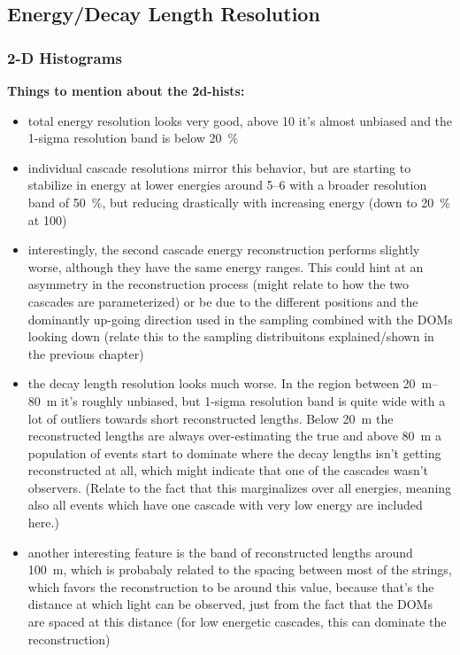\subsection{Energy/Decay Length Resolution}


\subsubsection{2-D Histograms}

\textbf{Things to mention about the 2d-hists:}
\begin{itemize}
    \item total energy resolution looks very good, above \SI{10}{\gev} it's almost unbiased and the 1-sigma resolution band is below \SI{20}{\percent}
    \item individual cascade resolutions mirror this behavior, but are starting to stabilize in energy at lower energies around \SIrange{5}{6}{\gev} with a broader resolution band of \SI{50}{\percent}, but reducing drastically with increasing energy (down to \SI{20}{\percent} at \SI{100}{\gev})
    \item interestingly, the second cascade energy reconstruction performs slightly worse, although they have the same energy ranges. This could hint at an asymmetry in the reconstruction process (might relate to how the two cascades are parameterized) or be due to the different positions and the dominantly up-going direction used in the sampling combined with the DOMs looking down (relate this to the sampling distribuitons explained/shown in the previous chapter)
    \item the decay length resolution looks much worse. In the region between \SIrange[range-phrase={~and~}]{20}{80}{\meter} it's roughly unbiased, but 1-sigma resolution band is quite wide with a lot of outliers towards short reconstructed lengths. Below \SI{20}{\meter} the reconstructed lengths are always over-estimating the true and above \SI{80}{\meter} a population of events start to dominate where the decay lengths isn't getting reconstructed at all, which might indicate that one of the cascades wasn't observers. (Relate to the fact that this marginalizes over all energies, meaning also all events which have one cascade with very low energy are included here.)
    \item another interesting feature is the band of reconstructed lengths around \SI{100}{\meter}, which is probabaly related to the spacing between most of the strings, which favors the reconstruction to be around this value, because that's the distance at which light can be observed, just from the fact that the DOMs are spaced at this distance (for low energetic cascades, this can dominate the reconstruction)
\end{itemize}


